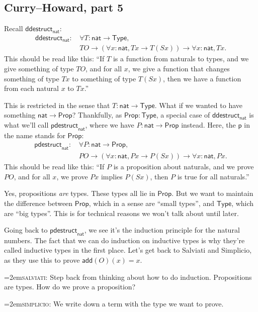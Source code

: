 \documentclass[11pt,paper=letter]{scrartcl}
\renewcommand{\sf}{\mathsf}
\newcommand{\simp}{\vspace{0.5em}\noindent\hangindent=2em\textsc{simplicio:} }
\newcommand{\salv}{\vspace{0.5em}\noindent\hangindent=2em\textsc{salviati:} }
\newcommand{\prop}{\mathsf{Prop}}
\newcommand{\type}{\mathsf{Type}}
\begin{document}
\subsection{Curry--Howard, part 5}

Recall $\sf{ddestruct}_\sf{nat}$:
\begin{align*}
\sf{ddestruct}_{\sf{nat}}:\,
& \forall T: \sf{nat} \to \type,\\
&TO \to (\forall x: \sf{nat}, Tx \to T(Sx)) \to \forall x: \sf{nat}, Tx.
\end{align*}
This should be read like this: ``If $T$ is a function from naturals to types, and we give something of type $TO$, and for all $x$, we give a function that changes something of type $Tx$ to something of type $T(Sx)$, then we have a function from each natural $x$ to $Tx$.''

This is restricted in the sense that $T: \sf{nat} \to \type$. What if we wanted to have something $\sf{nat} \to \prop$? Thankfully, as $\prop: \type$, a special case of $\sf{ddestruct}_\sf{nat}$ is what we'll call $\sf{pdestruct}_\sf{nat}$, where we have $P: \sf{nat} \to\prop$ instead. Here, the $\sf{p}$ in the name stands for $\prop$:
\begin{align*}
\sf{pdestruct}_{\sf{nat}}:\,
& \forall P: \sf{nat} \to \prop,\\
&PO \to (\forall x: \sf{nat}, Px \to P(Sx)) \to \forall x: \sf{nat}, Px.
\end{align*}
This should be read like this: ``If $P$ is a proposition about naturals, and we prove $PO$, and for all $x$, we prove $Px$ implies $P(Sx)$, then $P$ is true for all naturals.''

Yes, propositions \emph{are} types. These types all lie in $\prop$. But we want to maintain the difference between $\prop$, which in a sense are ``small types'', and $\type$, which are ``big types''. This is for technical reasons we won't talk about until later.

Going back to $\sf{pdestruct}_{\sf{nat}}$, we see it's the induction principle for the natural numbers. The fact that we can do induction on inductive types is why they're called inductive types in the first place. Let's get back to Salviati and Simplicio, as they use this to prove $\sf{add}(O)(x) = x$.

\salv Step back from thinking about how to do induction. Propositions are types. How do we prove a proposition?

\simp We write down a term with the type we want to prove.
\end{document}
